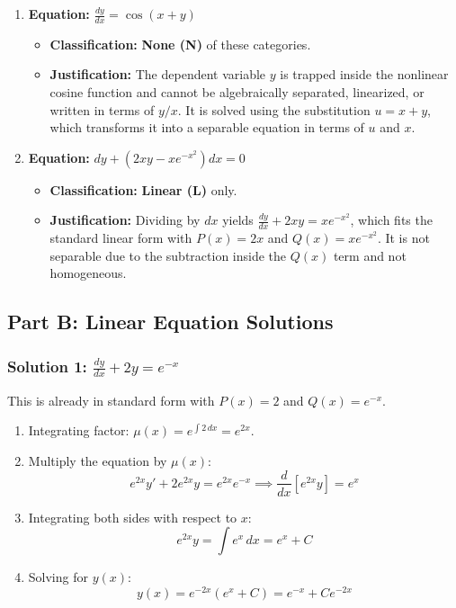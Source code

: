 \documentclass[11pt,letterpaper]{article}
\begin{document}
\begin{enumerate}[label=\textbf{\arabic*.}]
    \item \textbf{Equation:} $\frac{dy}{dx} = \cos(x+y)$
    \begin{itemize}
        \item \textbf{Classification:} \textbf{None (N)} of these categories.
        \item \textbf{Justification:} The dependent variable $y$ is trapped inside the nonlinear cosine function and cannot be algebraically separated, linearized, or written in terms of $y/x$. It is solved using the substitution $u = x+y$, which transforms it into a separable equation in terms of $u$ and $x$.
    \end{itemize}

    \item \textbf{Equation:} $dy + \left(2xy - x e^{-x^2}\right)dx = 0$
    \begin{itemize}
        \item \textbf{Classification:} \textbf{Linear (L)} only.
        \item \textbf{Justification:} Dividing by $dx$ yields $\frac{dy}{dx} + 2xy = x e^{-x^2}$, which fits the standard linear form with $P(x) = 2x$ and $Q(x) = x e^{-x^2}$. It is not separable due to the subtraction inside the $Q(x)$ term and not homogeneous.
    \end{itemize}
\end{enumerate}

\subsection*{Part B: Linear Equation Solutions}

\subsubsection*{Solution 1: $\frac{dy}{dx} + 2y = e^{-x}$}
This is already in standard form with $P(x) = 2$ and $Q(x) = e^{-x}$.
\begin{enumerate}
    \item Integrating factor: $\mu(x) = e^{\int 2 \, dx} = e^{2x}$.
    \item Multiply the equation by $\mu(x)$:
    \[ e^{2x} y' + 2e^{2x}y = e^{2x}e^{-x} \implies \frac{d}{dx}\left[ e^{2x}y \right] = e^x \]
    \item Integrating both sides with respect to $x$:
    \[ e^{2x}y = \int e^x \, dx = e^x + C \]
    \item Solving for $y(x)$:
    \[ y(x) = e^{-2x}(e^x + C) = e^{-x} + C e^{-2x} \]
\end{enumerate}
\end{document}
